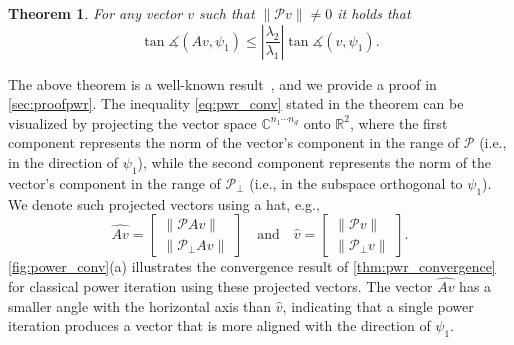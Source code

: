 \documentclass[10pt,preprint]{elsarticle}
\newtheorem{theorem}{\bf Theorem}[section]
\def\P{\mathcal{P}}
\begin{document}
\begin{theorem} \label{thm:pwr_conv_no_trunc}
For any vector $v$ such that $\|\P v\| \neq 0$ it holds that 
\begin{equation} \label{eq:pwr_conv}
\tan \measuredangle(Av,\psi_1) \leq \left|\frac{\lambda_2}{\lambda_1}\right|\tan\measuredangle(v,\psi_1). 
\end{equation}
\end{theorem}

\noindent
The above theorem is a well-known result~\cite{parlett}, and we provide a proof in \cref{sec:proofpwr}. The inequality \eqref{eq:pwr_conv} stated in the theorem can be visualized by projecting the vector space $\mathbb{C}^{n_1 \cdots n_d}$ onto $\mathbb{R}^2$, where the first component represents the norm of the vector's component in the range of $\P$ (i.e., in the direction of $\psi_1$), while the second component represents the norm of the vector's component in the range of $\P_{\perp}$ (i.e., in the subspace orthogonal to $\psi_1$). We denote such projected vectors using a hat, e.g., 
\begin{equation} \label{eq:R2_proj}
\widehat{Av} = \begin{bmatrix}
\|\P Av\| \\ \|\P_{\perp} Av\|
\end{bmatrix} 
\quad \text{and} \quad 
\widehat{v} = \begin{bmatrix}
\|\P v\| \\ \|\P_{\perp} v\|
\end{bmatrix}. 
\end{equation}
\cref{fig:power_conv}(a) illustrates the convergence result of \cref{thm:pwr_convergence} for classical power iteration using these projected vectors. The vector $\widehat{Av}$ has a smaller angle with the horizontal axis than $\widehat{v}$, indicating that a single power iteration produces a vector that is more aligned with the direction of $\psi_1$. 
\end{document}
